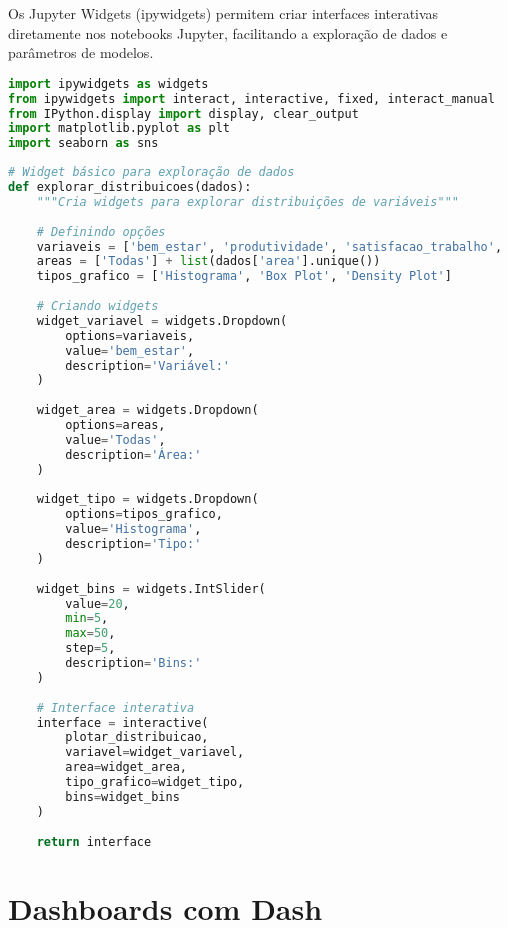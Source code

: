 Os Jupyter Widgets (ipywidgets) permitem criar interfaces interativas diretamente nos notebooks Jupyter, facilitando a exploração de dados e parâmetros de modelos.

\begin{pythonbox}
\begin{lstlisting}[language=Python]
import ipywidgets as widgets
from ipywidgets import interact, interactive, fixed, interact_manual
from IPython.display import display, clear_output
import matplotlib.pyplot as plt
import seaborn as sns
\end{lstlisting}
\end{pythonbox}

\begin{pythonbox}
\begin{lstlisting}[language=Python]
# Widget básico para exploração de dados
def explorar_distribuicoes(dados):
    """Cria widgets para explorar distribuições de variáveis"""
    
    # Definindo opções
    variaveis = ['bem_estar', 'produtividade', 'satisfacao_trabalho', 'idade', 'experiencia']
    areas = ['Todas'] + list(dados['area'].unique())
    tipos_grafico = ['Histograma', 'Box Plot', 'Density Plot']
    
    # Criando widgets
    widget_variavel = widgets.Dropdown(
        options=variaveis,
        value='bem_estar',
        description='Variável:'
    )
    
    widget_area = widgets.Dropdown(
        options=areas,
        value='Todas',
        description='Área:'
    )
    
    widget_tipo = widgets.Dropdown(
        options=tipos_grafico,
        value='Histograma',
        description='Tipo:'
    )
    
    widget_bins = widgets.IntSlider(
        value=20,
        min=5,
        max=50,
        step=5,
        description='Bins:'
    )
    
    # Interface interativa
    interface = interactive(
        plotar_distribuicao,
        variavel=widget_variavel,
        area=widget_area,
        tipo_grafico=widget_tipo,
        bins=widget_bins
    )
    
    return interface
\end{lstlisting}
\end{pythonbox}

\section{Dashboards com Dash}

